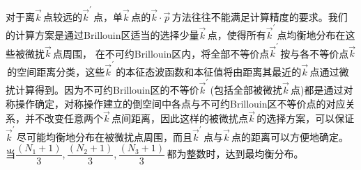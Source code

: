 对于离$\vec k$\,点较远的$\vec k^{\prime}$\,点，单$\vec k$\,点的$\vec k\cdot\vec p$\,方法往往不能满足计算精度的要求。我们的计算方案是通过\textrm{Brillouin}区适当的选择少量$\vec k$\,点，使得所有$\vec k^{\prime}$\,点均衡地分布在这些被微扰$\vec k$\,点周围，%
在不可约\textrm{Brillouin}区内，将全部不等价点$\vec k^{\prime}$\,按与各不等价点$\vec k$\,的空间距离分类，这些$\vec k^{\prime}$\,的本征态波函数和本征值将由距离其最近的$\vec k$\,点通过微扰计算得到。因为不可约\textrm{Brillouin}区的不等价$\vec k^{\prime}$\,(包括全部被微扰$\vec k$\,点)都是通过对称操作确定，对称操作建立的倒空间中各点与不可约\textrm{Brillouin}区不等价点的对应关系，并不改变任意两个$\vec k$\,点间距离，因此这样的被微扰点$\vec k$\,的选择方案，可以保证$\vec k^{\prime}$\,尽可能均衡地分布在被微扰点周围，而且$\vec k^{\prime}$\,点与$\vec k$\,点的距离可以方便地确定。当$\dfrac{(N_1+1)}3$,\,$\dfrac{(N_2+1)}3$,\,$\dfrac{(N_3+1)}3$\,都为整数时，达到最均衡分布。

